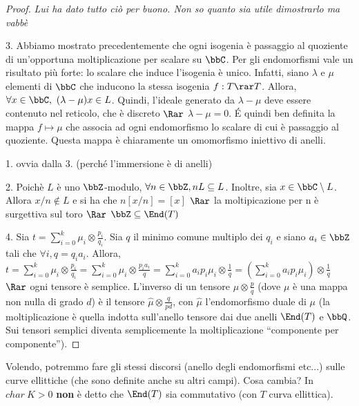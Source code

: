     \begin{proof} {\it Lui ha dato tutto ciò per buono. Non so quanto sia utile dimostrarlo ma vabbè}

    3. Abbiamo mostrato precedentemente che ogni isogenia è passaggio al quoziente di un'opportuna moltiplicazione per scalare su $\bbC$. Per gli endomorfismi vale un risultato più forte: lo scalare che induce l'isogenia è unico.
    Infatti, siano $\lambda$ e $\mu$ elementi di $\bbC$ che inducono la stessa isogenia $f:T\rar T$. Allora, $\forall x\in \bbC,  \ (\lambda - \mu)x \in L$. Quindi, l'ideale generato da $\lambda -\mu$ deve essere contenuto nel reticolo, che è discreto $\Rar$ $\lambda - \mu = 0$. \'E quindi ben definita la mappa $f \mapsto \mu$ che associa ad ogni endomorfismo lo scalare di cui è passaggio al quoziente. Questa mappa è chiaramente un omomorfismo iniettivo di anelli.

    1. ovvia dalla 3. (perché l'immersione è di anelli)

    2. Poichè $L$ è uno $\bbZ$-modulo, $\forall n \in \bbZ, nL\subseteq L$. Inoltre, sia $x\in \bbC \setminus L$. Allora $x/n \not\in L$ e si ha che $n[x/n]=[x]$ $\Rar$ la moltipicazione per n è surgettiva sul toro $\Rar$ $\bbZ \subseteq \End(T)$

    4. Sia $t=\sum\limits_{i=0}^{k} \mu_{i} \otimes \frac{p_{i}}{q_{i}}$. Sia $q$ il minimo comune multiplo dei $q_{i}$ e siano $a_{i} \in \bbZ$ tali che $\forall i, q=q_{i}a_{i}$. Allora,\\
    $t=\sum\limits_{i=0}^{k} \mu_{i}\otimes \frac{p_{i}}{q_{i}} = \sum\limits_{i=0}^{k} \mu_{i} \otimes \frac{p_{i}a_{i}}{q}= \sum\limits_{i=0}^{k} a_{i}p_{i}\mu_{i}\otimes \frac{1}{q} = (\sum\limits_{i=0}^{k} a_{i}p_{i}\mu_{i})\otimes \frac{1}{q}$ $\Rar$ ogni tensore è semplice. L'inverso di un tensore $\mu \otimes \frac{p}{q}$ (dove $\mu$ è una mappa non nulla di grado $d$) è il tensore $\hat{\mu} \otimes \frac{q}{pd}$, con $\hat{\mu}$ l'endomorfismo duale di $\mu$ (la moltiplicazione è quella indotta sull'anello tensore dai due anelli $\End(T)$ e $\bbQ$. Sui tensori semplici diventa semplicemente la moltiplicazione ``componente per componente'').
    \end{proof}

    Volendo, potremmo fare gli stessi discorsi (anello degli endomorfismi etc...) sulle curve ellittiche (che sono definite anche su altri campi). Cosa cambia? In $char \ K >0$ {\bf non } è detto che $\End(T)$ sia commutativo (con $T$ curva ellittica).


